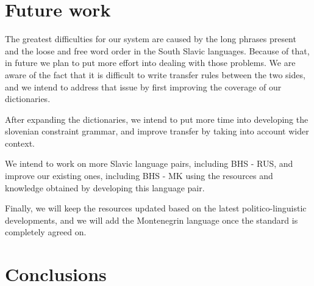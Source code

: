 \section{Future work}

The greatest difficulties for our system are caused by the long phrases present 
and the loose and free word order in the South Slavic languages.
Because of that, in future we plan to put more effort into dealing with those problems.
We are aware of the fact that it is difficult to write transfer rules between the two sides,
and we intend to address that issue by first improving the coverage of our dictionaries.

After expanding the dictionaries, we intend to put more time into developing the slovenian constraint grammar,
and improve transfer by taking into account wider context.

We intend to work on more Slavic language pairs, including BHS - RUS,
and improve our existing ones, including BHS - MK using the resources and knowledge obtained by developing this language pair.

Finally, we will keep the resources updated based on the latest politico-linguistic developments,
and we will add the Montenegrin language once the standard is completely agreed on.



\section{Conclusions}
